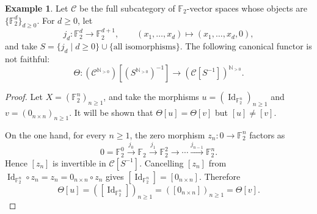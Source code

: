 \documentclass[10pt,a4paper]{amsart}
\theoremstyle{plain}
\theoremstyle{definition}
\newtheorem{example}[theorem]{Example}
\theoremstyle{remark}
\begin{document}
\begin{example}\label{ex:product-localization-not-faithful}
  Let $\mathcal C$ be the full subcategory of $\mathbb F_2$-vector spaces whose objects are $\{\mathbb F_2^d\}_{d \geq 0}$.
  For $d\geq0$, let
  \[
    j_d:\mathbb F_2^d\longrightarrow\mathbb F_2^{d+1},
    \qquad
    (x_1,\ldots,x_d) \longmapsto (x_1,\ldots,x_d,0),
  \]
  and take $S=\{j_d\mid d\geq0\} \cup \{\text{all isomorphisms}\}$.
  The following canonical functor is not faithful:
  \[
    \Theta:
    (\mathcal C^{\mathbb N_{>0}})
    [(S^{\mathbb N_{>0}})^{-1}]
    \longrightarrow
    (\mathcal C[S^{-1}])^{\mathbb N_{>0}}.
  \]
\end{example}

\begin{proof}
  Let $X=(\mathbb F_2^n)_{n\geq1}$, and take the morphisms $u=(\operatorname{Id}_{\mathbb F_2^n})_{n\geq1}$ and $v=(0_{n\times n})_{n\geq1}$.
  It will be shown that $\Theta[u]=\Theta[v]$ but $[u]\ne[v]$.

  \medskip

  On the one hand, for every $n\geq1$, the zero morphism $z_n:0\longrightarrow\mathbb F_2^n$ factors as
  \[
    0=\mathbb F_2^0
    \xrightarrow{j_0}\mathbb F_2
    \xrightarrow{j_1}\mathbb F_2^2
    \longrightarrow\cdots
    \xrightarrow{j_{n-1}}\mathbb F_2^n.
  \]
  Hence $[z_n]$ is invertible in $\mathcal C[S^{-1}]$.
  Cancelling $[z_n]$ from $\operatorname{Id}_{\mathbb F_2^n}\circ z_n =z_n =0_{n\times n}\circ z_n$ gives $[\operatorname{Id}_{\mathbb F_2^n}] =[0_{n\times n}]$.
  Therefore
  \[
    \Theta[u]
    =([\operatorname{Id}_{\mathbb F_2^n}])_{n\geq1}
    =([0_{n\times n}])_{n\geq1}
    =\Theta[v].
  \]

  \medskip


\end{proof}
\end{document}
